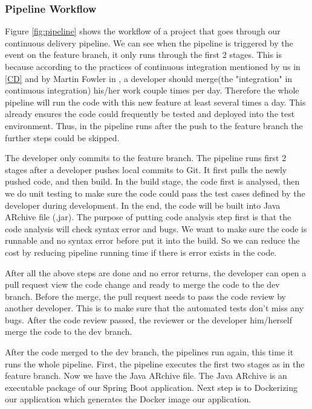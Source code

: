 \subsubsection{Pipeline Workflow}
Figure \ref{fig:pipeline} shows the workflow of a project that goes through our continuous delivery pipeline.
We can see when the pipeline is triggered by the event on the feature branch, it only runs through the first 2 stages. This is because according to the practices of continuous integration mentioned by us in \ref{CD} and by Martin Fowler in \cite{fowler2006continuous}, a developer should merge(the "integration" in continuous integration) his/her work couple times per day. Therefore the whole pipeline will run the code with this new feature at least several times a day. This already ensures the code could frequently be tested and deployed into the test environment. Thus, in the pipeline runs after the push to the feature branch the further steps could be skipped. 
\par
 The developer only commits to the feature branch. The pipeline runs first 2 stages after a developer pushes local commits to Git. It first pulls the newly pushed code, and then build. In the build stage, the code first is analysed, then we do unit testing to make sure the code could pass the test cases defined by the developer during development. In the end, the code will be built into Java ARchive file (.jar). The purpose of putting code analysis step first is that the code analysis will check syntax error and bugs. We want to make sure the code is runnable and no syntax error before put it into the build. So we can reduce the cost by reducing pipeline running time if there is error exists in the code. 

\par
After all the above steps are done and no error returns, the developer can open a pull request view the code change and ready to merge the code to the dev branch. Before the merge, the pull request needs to pass the code review by another developer. This is to make sure that the automated tests don't miss any bugs. After the code review passed, the reviewer or the developer him/herself merge the code to the dev branch.  
\par
After the code merged to the dev branch, the pipelines run again, this time it runs the whole pipeline. First, the pipeline executes the first two stages as in the feature branch. Now we have the Java ARchive file. The Java ARchive is an executable package of our Spring Boot application. Next step is to Dockerizing our application which generates the Docker image our application.
\par

